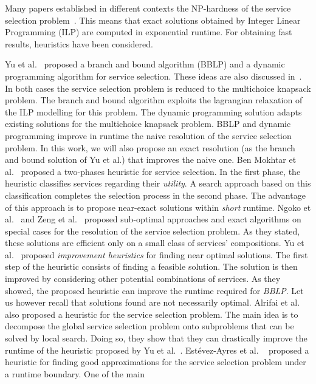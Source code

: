 \documentclass[a4paper]{article}
\begin{document}
Many papers established in different contexts the NP-hardness of the service selection problem~\cite{Lee,Yu}. 
This means that exact solutions obtained by Integer Linear Programming (ILP) are computed 
in exponential runtime. 
For obtaining fast results, heuristics have  been considered. 

Yu et al.~\cite{Yu,Yu:2004:SSA:1018413.1019049} proposed a branch and bound algorithm (BBLP) and a dynamic 
programming algorithm  for service selection. These ideas are also discussed in~\cite{Lee}. In both cases the service
 selection problem is reduced to the multichoice 
knapsack problem. The branch and bound algorithm exploits the lagrangian relaxation of the ILP modelling 
for this problem. The dynamic programming solution adapts existing solutions for the multichoice knapsack problem. 
BBLP and dynamic programming  improve in runtime the naive resolution of the service selection problem. 
In this work, we will also propose an exact resolution (as the branch and bound solution of Yu et al.) that 
improves the naive one.
Ben Mokhtar et al.~\cite{BenMokhtar} proposed a two-phases 
heuristic for service selection. In the first phase, the heuristic classifies services regarding 
their {\it utility}. A search approach based on this classification completes the selection process in the second phase. 
The advantage of this approach is to propose near-exact solutions within {\it short} runtime. Ngoko et al.~\cite{JISA} 
and Zeng et al.~\cite{ZengMiddleware} proposed sub-optimal 
approaches and exact algorithms on special cases for the resolution of the service selection problem. As they stated, these 
solutions are efficient only on a small class of services' compositions. Yu et al.~\cite{Yu:2004:SSA:1018413.1019049} 
proposed  {\it improvement heuristics} for finding near optimal 
solutions. The first step of the heuristic consists of finding a feasible solution. 
The solution is then improved by considering other potential combinations of services. As they showed, the proposed 
heuristic can improve the runtime required for {\it BBLP}. Let us however recall that solutions found are not 
necessarily optimal. Alrifai et al.~\cite{Alrifai} also proposed a heuristic for the service selection problem. 
The main idea is to decompose the global service selection problem onto subproblems that can be solved by local 
search. Doing so, they show that they can drastically improve the runtime of the heuristic proposed by Yu et al.~\cite{Yu}. 
Est\'evez-Ayres et al. ~\cite{DBLP:journals/concurrency/Estevez-AyresGBD11} proposed a heuristic 
for finding good approximations for the service selection problem under a runtime boundary. One of the main 
\end{document}
